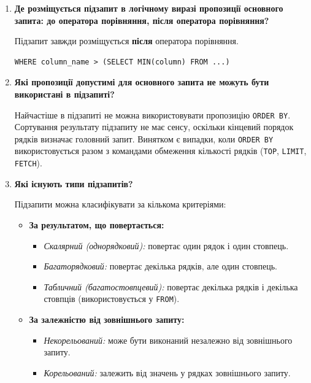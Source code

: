 \documentclass{article}
\begin{document}
\begin{enumerate}[label=\arabic*., leftmargin=*]
        \item \textbf{Де розміщується підзапит в логічному виразі пропозиції основного запита: до оператора порівняння, після оператора порівняння?}
        
        Підзапит завжди розміщується \textbf{після} оператора порівняння.
        \begin{CodeBox}[Приклад]
        \begin{verbatim}
WHERE column_name > (SELECT MIN(column) FROM ...)
        \end{verbatim}
        \end{CodeBox}

        \item \textbf{Які пропозиції допустимі для основного запита не можуть бути використані в підзапиті?}
        
        Найчастіше в підзапиті не можна використовувати пропозицію \texttt{ORDER BY}. Сортування результату підзапиту не має сенсу, оскільки кінцевий порядок рядків визначає головний запит. Винятком є випадки, коли \texttt{ORDER BY} використовується разом з командами обмеження кількості рядків (\texttt{TOP}, \texttt{LIMIT}, \texttt{FETCH}).

        \item \textbf{Які існують типи підзапитів?}
        
        Підзапити можна класифікувати за кількома критеріями:
        \begin{itemize}
            \item \textbf{За результатом, що повертається:}
            \begin{itemize}
                \item \textit{Скалярний (однорядковий):} повертає один рядок і один стовпець.
                \item \textit{Багаторядковий:} повертає декілька рядків, але один стовпець.
                \item \textit{Табличний (багатостовпцевий):} повертає декілька рядків і декілька стовпців (використовується у \texttt{FROM}).
            \end{itemize}
            \item \textbf{За залежністю від зовнішнього запиту:}
            \begin{itemize}
                \item \textit{Некорельований:} може бути виконаний незалежно від зовнішнього запиту.
                \item \textit{Корельований:} залежить від значень у рядках зовнішнього запиту.
            \end{itemize}
        \end{itemize}


\end{enumerate}
\end{document}
